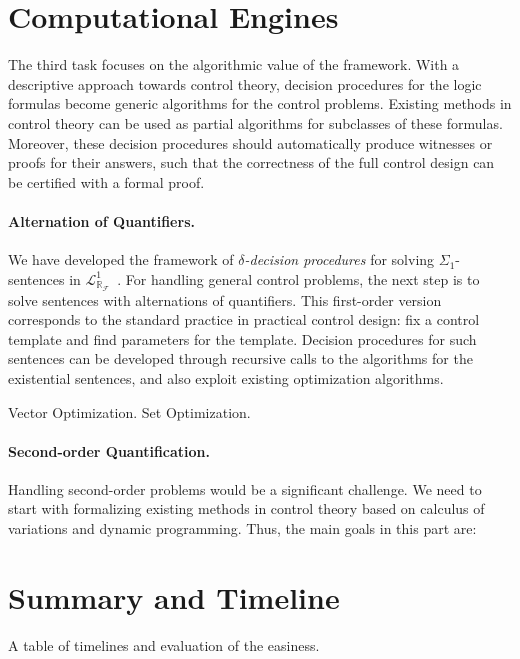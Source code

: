 \documentclass[10pt]{article}
\newcommand{\lrf}{\mathcal{L}_{\mathbb{R}_{\mathcal{F}}}}
\theoremstyle{definition}
\begin{document}
\section{Computational Engines}


The third task focuses on the algorithmic value of the framework. With a descriptive approach towards control theory, decision procedures for the logic formulas become generic algorithms for the control problems. Existing methods in control theory can be used as partial algorithms for subclasses of these formulas. Moreover, these decision procedures should automatically produce witnesses or proofs for their answers, such that the correctness of the full control design can be certified with a formal proof.

\paragraph{Alternation of Quantifiers.} We have developed the framework of {\em $\delta$-decision procedures} for solving $\Sigma_1$-sentences in $\lrf^1$~\cite{DBLP:conf/cade/GaoAC12}. For handling general control problems, the next step is to solve sentences with alternations of quantifiers. This first-order version corresponds to the standard practice in practical control design: fix a control template and find parameters for the template. Decision procedures for such sentences can be developed through recursive calls to the algorithms for the existential sentences, and also exploit existing optimization algorithms. 

Vector Optimization. Set Optimization. 

\paragraph{Second-order Quantification.} Handling second-order problems would be a significant challenge. We need to start with formalizing existing methods in control theory based on calculus of variations and dynamic programming. Thus, the main goals in this part are:
\section{Summary and Timeline}

A table of timelines and evaluation of the easiness. 














\end{document}
